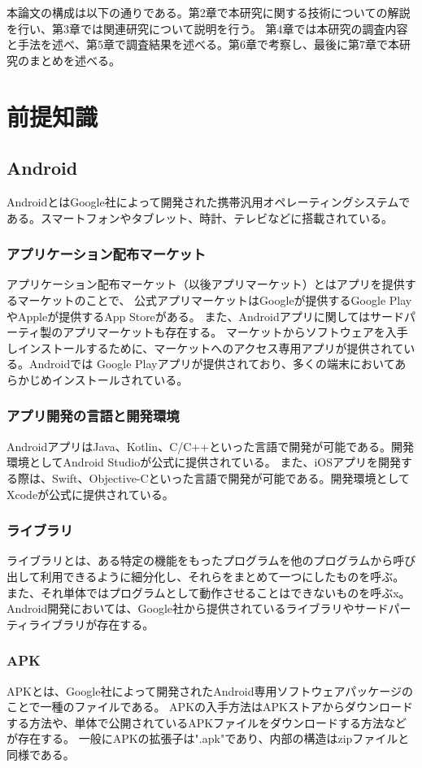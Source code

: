 \documentclass[a4j]{jarticle}
\begin{document}
本論文の構成は以下の通りである。第2章で本研究に関する技術についての解説を行い、第3章では関連研究について説明を行う。
第4章では本研究の調査内容と手法を述べ、第5章で調査結果を述べる。第6章で考察し、最後に第7章で本研究のまとめを述べる。


\newpage
\section{前提知識}
\subsection{Android}
AndroidとはGoogle社によって開発された携帯汎用オペレーティングシステムである。スマートフォンやタブレット、時計、テレビなどに搭載されている。

\subsubsection{アプリケーション配布マーケット}
アプリケーション配布マーケット（以後アプリマーケット）とはアプリを提供するマーケットのことで、
公式アプリマーケットはGoogleが提供するGoogle PlayやAppleが提供するApp Storeがある。
また、Androidアプリに関してはサードパーティ製のアプリマーケットも存在する。
マーケットからソフトウェアを入手しインストールするために、マーケットへのアクセス専用アプリが提供されている。Androidでは
Google Playアプリが提供されており、多くの端末においてあらかじめインストールされている。
\subsubsection{アプリ開発の言語と開発環境}
AndroidアプリはJava、Kotlin、C/C++といった言語で開発が可能である。開発環境としてAndroid Studioが公式に提供されている。
また、iOSアプリを開発する際は、Swift、Objective-Cといった言語で開発が可能である。開発環境としてXcodeが公式に提供されている。
\subsubsection{ライブラリ}
ライブラリとは、ある特定の機能をもったプログラムを他のプログラムから呼び出して利用できるように細分化し、それらをまとめて一つにしたものを呼ぶ。
また、それ単体ではプログラムとして動作させることはできないものを呼ぶx。
Android開発においては、Google社から提供されているライブラリやサードパーティライブラリが存在する。
\subsubsection{APK}
APKとは、Google社によって開発されたAndroid専用ソフトウェアパッケージのことで一種のファイルである。
APKの入手方法はAPKストアからダウンロードする方法や、単体で公開されているAPKファイルをダウンロードする方法などが存在する。
一般にAPKの拡張子は".apk"であり、内部の構造はzipファイルと同様である。
\end{document}
